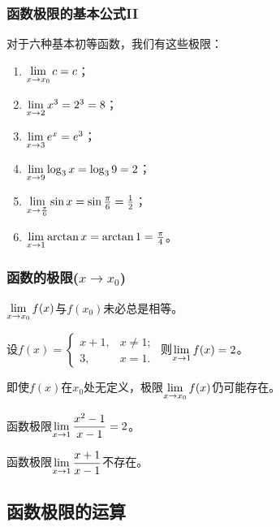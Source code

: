 \documentclass[14pt,notheorems,leqno,xcolor={rgb}]{beamer} %
\begin{document}
\begin{frame}
\frametitle{函数极限的基本公式II}
\noindent{}
\end{frame}

\begin{frame}
\begin{example*}
对于六种基本初等函数，我们有这些极限：
\begin{enumerate}[<+->]
  \item $\lim\limits_{x\to x_0}c=c$；
  \item $\lim\limits_{x\to 2}x^3=2^3=8$；
  \item $\lim\limits_{x\to 3}e^x=e^3$；
  \item $\lim\limits_{x\to 9}\log_3x=\log_3 9=2$；
  \item $\lim\limits_{x\to \frac{\pi}6}\sin x=\sin\frac{\pi}6=\frac12$；
  \item $\lim\limits_{x\to 1}\arctan x=\arctan1=\frac{\pi}4$。
\end{enumerate}
\end{example*}
\end{frame}

\begin{frame}
\frametitle{函数的极限($x\to x_0$)}
\begin{remark*}
$\lim\limits_{x\to x_0}f(x)$与$f(x_0)$未必总是相等。\pause
\end{remark*}
\pause
\begin{example}
设$f(x)=\left\{\begin{array}{ll}x+1, & x\neq 1; \\ 3, & x=1.\end{array}\right.$
则$\lim\limits_{x\to 1}f(x)=2$。
\end{example}
\pause
\begin{remark*}
即使$f(x)$在$x_0$处无定义，极限$\lim\limits_{x\to x_0}f(x)$仍可能存在。
\end{remark*}
\pause
\begin{example}
函数极限$\lim\limits_{x\to 1}\dfrac{x^2-1}{x-1}=2$。
\end{example}
\pause
\begin{example}
函数极限$\lim\limits_{x\to 1}\dfrac{x+1}{x-1}$不存在。
\end{example}
\end{frame}

\subsection{函数极限的运算}
\end{document}
